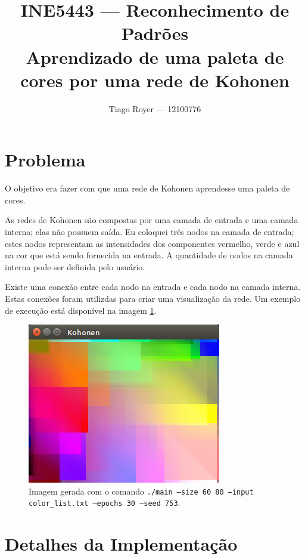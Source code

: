 \documentclass{article}
\begin{document}
\title{
    INE5443 --- Reconhecimento de Padrões\\
    Aprendizado de uma paleta de cores por uma rede de Kohonen
}
\author{
    Tiago Royer --- 12100776
}

\maketitle

\section{Problema}

O objetivo era fazer com que uma rede de Kohonen aprendesse uma paleta de cores.

As redes de Kohonen são compostas por uma camada de entrada e uma camada interna;
elas não possuem saída.
Eu coloquei três nodos na camada de entrada;
estes nodos representam as intensidades dos componentes vermelho, verde e azul
na cor que está sendo fornecida na entrada.
A quantidade de nodos na camada interna pode ser definida pelo usuário.

Existe uma conexão entre cada nodo na entrada e cada nodo na camada interna.
Estas conexões foram utilizdas para criar uma visualização da rede.
Um exemplo de execução está disponível na imagem \ref{demo1}.

\begin{figure}[h]
    \centering
    \includegraphics[scale=0.5]{demo1.png}
    \caption{
        Imagem gerada com o comando
        \texttt{./main --size 60 80 --input color\_list.txt --epochs 30 --seed 753}.
    }
    \label{demo1}
\end{figure}

\section{Detalhes da Implementação}
\end{document}
